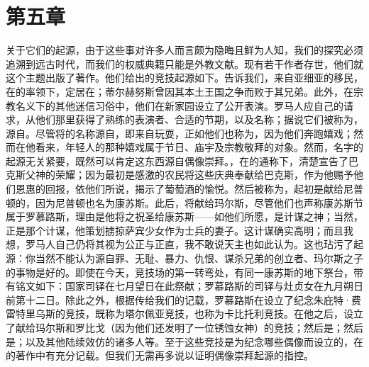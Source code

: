 
\section{第五章}

关于它们的起源，由于这些事对许多人而言颇为隐晦且鲜为人知，我们的探究必须追溯到远古时代，而我们的权威典籍只能是外教文献。现有若干作者存世，他们就这个主题出版了著作。他们给出的竞技起源如下。告诉我们，来自亚细亚的移民，在的率领下，定居在；蒂尔赫努斯曾因其本土王国之争而败于其兄弟。此外，在宗教名义下的其他迷信习俗中，他们在新家园设立了公开表演。罗马人应自己的请求，从他们那里获得了熟练的表演者、合适的节期，以及名称；据说它们被称为，源自。尽管将的名称源自，即来自玩耍，正如他们也称为，因为他们奔跑嬉戏；然而在他看来，年轻人的那种嬉戏属于节日、庙宇及宗教敬拜的对象。然而，名字的起源无关紧要，既然可以肯定这东西源自偶像崇拜。，在的通称下，清楚宣告了巴克斯父神的荣耀；因为最初是感激的农民将这些庆典奉献给巴克斯，作为他赐予他们恩惠的回报，依他们所说，揭示了葡萄酒的愉悦。然后被称为，起初是献给尼普顿的，因为尼普顿也名为康苏斯。此后，将献给玛尔斯，尽管他们也声称康苏斯节属于罗慕路斯，理由是他将之祝圣给康苏斯——如他们所愿，是计谋之神；当然，正是那个计谋，他策划掳掠萨宾少女作为士兵的妻子。这计谋确实高明；而且我想，罗马人自己仍将其视为公正与正直，我不敢说天主也如此认为。这也玷污了起源：你当然不能认为源自罪、无耻、暴力、仇恨、谋杀兄弟的创立者、玛尔斯之子的事物是好的。即使在今天，竞技场的第一转弯处，有同一康苏斯的地下祭台，带有铭文如下：国家司铎在七月望日在此祭献；罗慕路斯的司铎与灶贞女在九月朔日前第十二日。除此之外，根据传给我们的记载，罗慕路斯在设立了纪念朱庇特·费雷特里乌斯的竞技，既称为塔尔佩亚竞技，也称为卡比托利竞技。在他之后，设立了献给玛尔斯和罗比戈（因为他们还发明了一位锈蚀女神）的竞技；然后是；然后是；以及其他陆续效仿的诸多人等。至于这些竞技是为纪念哪些偶像而设立的，在的著作中有充分记载。但我们无需再多说以证明偶像崇拜起源的指控。\par

